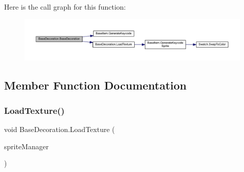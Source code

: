 Here is the call graph for this function\+:
\nopagebreak
\begin{figure}[H]
\begin{center}
\leavevmode
\includegraphics[width=350pt]{class_base_decoration_a75dae0a3df64d463e98ba2bdeed02265_cgraph}
\end{center}
\end{figure}


\subsection{Member Function Documentation}
\mbox{\label{class_base_decoration_aafdc27ba3ede4f9eadc66e8dd6fa9b1a}} 
\subsubsection{\texorpdfstring{LoadTexture()}{LoadTexture()}}
{\footnotesize\ttfamily void Base\+Decoration.\+Load\+Texture (\begin{DoxyParamCaption}\item[{\mbox{\hyperlink{class_sprite_manager}{Sprite\+Manager}}}]{sprite\+Manager }\end{DoxyParamCaption})}

